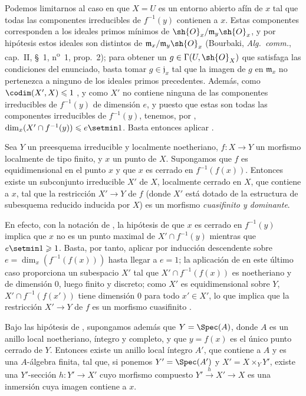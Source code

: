 Podemos limitarnos al caso en que $X=U$ es un entorno abierto afín de $x$ tal que todas las componentes irreducibles de $f^{-1}(y)$ contienen a $x$.
Estas componentes corresponden a los ideales primos mínimos de $\sh{O}_x/\mathfrak{m}_y\sh{O}_x$, y por hipótesis estos ideales son distintos de $\mathfrak{m}_x/\mathfrak{m}_y\sh{O}_x$ (Bourbaki, \emph{Alg.\ comm.}, cap.~II, \S~1, n\textsuperscript{o}~1, prop.~2); para obtener un $g\in\Gamma(U,\sh{O}_X)$ que satisfaga las condiciones del enunciado, basta tomar $g\in\mathfrak{j}_x$ tal que la imagen de $g$ en $\mathfrak{m}_x$ no pertenezca a ninguno de los ideales primos precedentes.
Además, como $\codim(X',X)\leq 1$ , y como $X'$ no contiene ninguna de las componentes irreducibles de $f^{-1}(y)$ de dimensión $e$, y puesto que estas son todas las componentes irreducibles de $f^{-1}(y)$, tenemos, por , $\dim_x(X'\cap f^{-1}(y))\leq e\setmin 1$.
Basta entonces aplicar .

\begin{proposition}[14.5.3]
\label{IV.14.5.3}
Sea $Y$ un preesquema irreducible y localmente noetheriano, $f:X\to Y$ un morfismo localmente de tipo finito, y $x$ un punto de $X$.
Supongamos que $f$ es equidimensional en el punto $x$ y que $x$ es cerrado en $f^{-1}(f(x))$.
Entonces existe un subconjunto irreducible $X'$ de $X$, localmente cerrado en $X$, que contiene a $x$, tal que la restricción $X'\to Y$ de $f$ \textup{(donde $X'$ está dotado de la estructura de subesquema reducido inducida por $X$)} es un morfismo \emph{cuasifinito y dominante}.
\end{proposition}

En efecto, con la notación de , la hipótesis de que $x$ es cerrado en $f^{-1}(y)$ implica que $x$ no es un punto maximal de $X'\cap f^{-1}(y)$ mientras que $e\setmin 1\geq 1$.
Basta, por tanto, aplicar  por inducción descendente sobre $e=\dim_x(f^{-1}(f(x)))$ hasta llegar a $e=1$; la aplicación de  en este último caso proporciona un subespacio $X'$ tal que $X'\cap f^{-1}(f(x))$ es noetheriano y de dimensión $0$, luego finito y discreto; como $X'$ es equidimensional sobre $Y$, $X'\cap f^{-1}(f(x'))$ tiene dimensión $0$ para todo $x'\in X'$, lo que implica que la restricción $X'\to Y$ de $f$ es un morfismo cuasifinito .

\begin{corollary}[14.5.4]
\label{IV.14.5.4}
Bajo las hipótesis de , supongamos además que $Y=\Spec(A)$, donde $A$ es un anillo local noetheriano, íntegro y \textup{completo}, y que $y=f(x)$ es el único punto cerrado de $Y$.
Entonces existe un anillo local íntegro $A'$, que contiene a $A$ y es una $A$-álgebra finita, tal que, si ponemos $Y'=\Spec(A')$ y $X'=X\times_Y Y'$, existe una $Y'$-sección $h:Y'\to X'$ cuyo morfismo compuesto $Y'\xrightarrow{h}X'\to X$ es una inmersión cuya imagen contiene a $x$.
\end{corollary}

